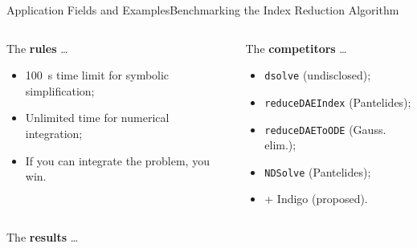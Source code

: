 \begin{frame}{Application Fields and Examples}{Benchmarking the Index Reduction Algorithm}
  \vspace{-1.0em}
  \begin{columns}
    \begin{column}[t]{0.5\textwidth}
      The \textbf{rules} \dots
      \begin{itemize}
        \item \SI{100}{\second} time limit for symbolic simplification;
        \item Unlimited time for numerical integration;
        \item If you can integrate the problem, you win.
      \end{itemize}
    \end{column}
    \begin{column}[t]{0.5\textwidth}
      The \textbf{competitors} \dots \\
      \begin{itemize}
        \item \Maple{} \texttt{dsolve} (undisclosed);
        \item \Matlab{} \texttt{reduceDAEIndex} (Pantelides);
        \item \Matlab{} \texttt{reduceDAEToODE} (Gauss. elim.);
        \item \Mathematica{} \texttt{NDSolve} (Pantelides);
        \item \Maple{} + \Matlab{} Indigo (proposed).
      \end{itemize}
    \end{column}
  \end{columns}
  \vspace{-0.5em}
  \hspace{-1.0em}The \textbf{results} \dots \\[0.5em]
\end{frame}
